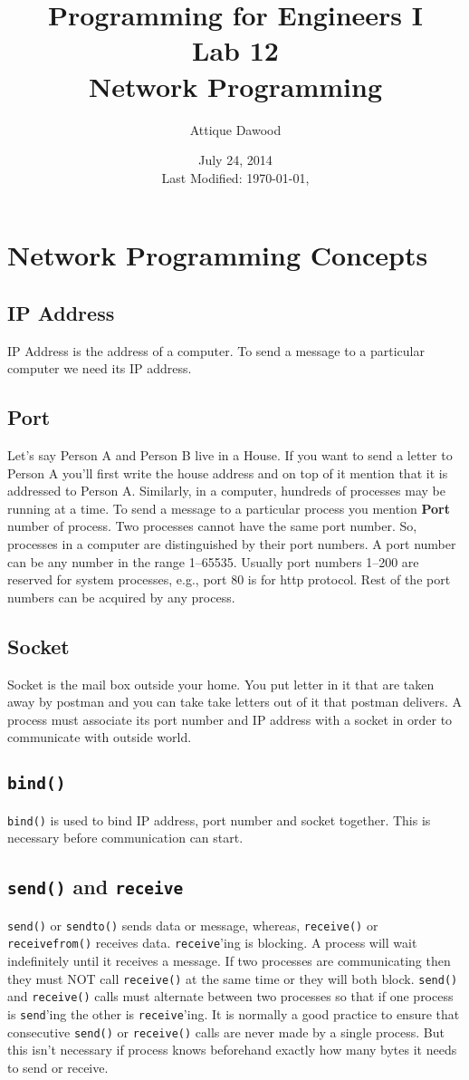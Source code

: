 \documentclass[12pt,a4paper]{article}
\title{\vspace{-1cm}Programming for Engineers I\\Lab 12\\Network Programming}
\author{Attique Dawood}
\date{July 24, 2014\\[0.2cm] Last Modified: \today, \currenttime}
\begin{document}
\maketitle
\section{Network Programming Concepts}
\subsection{IP Address}
IP Address is the address of a computer. To send a message to a particular computer we need its IP address.
\subsection{Port}
Let's say Person A and Person B live in a House. If you want to send a letter to Person A you'll first write the house address and on top of it mention that it is addressed to Person A. Similarly, in a computer, hundreds of processes may be running at a time. To send a message to a particular process you mention \textbf{Port} number of process. Two processes cannot have the same port number. So, processes in a computer are distinguished by their port numbers. A port number can be any number in the range 1--65535. Usually port numbers 1--200 are reserved for system processes, e.g., port 80 is for http protocol. Rest of the port numbers can be acquired by any process.
\subsection{Socket}
Socket is the mail box outside your home. You put letter in it that are taken away by postman and you can take take letters out of it that postman delivers. A process must associate its port number and IP address with a socket in order to communicate with outside world.
\subsection{\texttt{bind()}}
\verb|bind()| is used to bind IP address, port number and socket together. This is necessary before communication can start.
\subsection{\texttt{send()} and \texttt{receive}}
\verb|send()| or \verb|sendto()| sends data or message, whereas, \verb|receive()| or \verb|receivefrom()| receives data. \verb|receive|'ing is blocking. A process will wait indefinitely until it receives a message. If two processes are communicating then they must NOT call \verb|receive()| at the same time or they will both block. \verb|send()| and \verb|receive()| calls must alternate between two processes so that if one process is \verb|send|'ing the other is \verb|receive|'ing. It is normally a good practice to ensure that consecutive \verb|send()| or \verb|receive()| calls are never made by a single process. But this isn't necessary if process knows beforehand exactly how many bytes it needs to send or receive.
\end{document}
